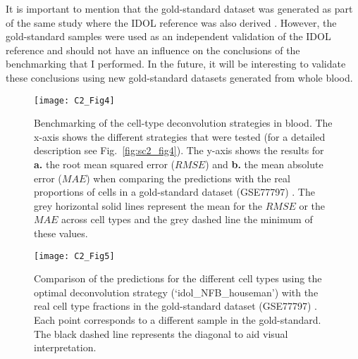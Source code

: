 \bigskip

It is important to mention that the gold-standard dataset was generated as part of the same study where the IDOL reference was also derived \cite{Koestler2016}. However, the gold-standard samples were used as an independent validation of the IDOL reference and should not have an influence on the conclusions of the benchmarking that I performed. In the future, it will be interesting to validate these conclusions using new gold-standard datasets generated from whole blood.

\bigskip


\begin{figure}[htbp!] 
	\centering    
	\texttt{[image: C2\_Fig4]}
	\caption[Benchmarking of the cell-type deconvolution strategies in blood: $RMSE$ and $MAE$]{Benchmarking of the cell-type deconvolution strategies in blood. The x-axis shows the different strategies that were tested (for a detailed description see Fig.~\ref{fig:sc2_fig4}). The y-axis shows the results for \textbf{a.} the root mean squared error ($RMSE$) and \textbf{b.} the mean absolute error ($MAE$) when comparing the predictions with the real proportions of cells in a gold-standard dataset (GSE77797) \cite{Koestler2016}. The grey horizontal solid lines represent the mean for the $RMSE$ or the $MAE$ across cell types and the grey dashed line the minimum of these values.}
	\label{fig:c2_fig4}
\end{figure}

\begin{figure}[htbp!] 
	\centering    
	\texttt{[image: C2\_Fig5]}
	\caption[Predictions obtained for each blood cell type using the optimal deconvolution strategy]{Comparison of the predictions for the different cell types using the optimal deconvolution strategy (`idol\_NFB\_houseman') with the real cell type fractions in the gold-standard dataset (GSE77797) \cite{Koestler2016}. Each point corresponds to a different sample in the gold-standard. The black dashed line represents the diagonal to aid visual interpretation.}
	\label{fig:c2_fig5}
\end{figure}


